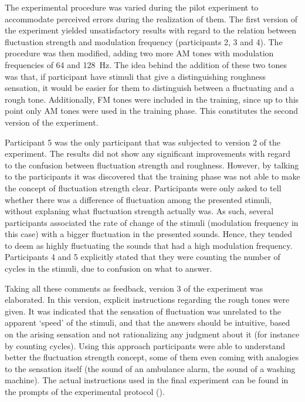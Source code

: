\documentclass[../main.tex]{subfiles}
\begin{document}
The experimental procedure was varied during the pilot experiment to accommodate
perceived errors during the realization of them. The first version of the
experiment yielded unsatisfactory results with regard to the relation between
fluctuation strength and modulation frequency (participants 2, 3 and 4). The
procedure was then modified, adding two more \gls{AM} tones with modulation
frequencies of 64 and 128~Hz. The idea behind the addition of these two tones
was that, if participant have stimuli that give a distinguishing roughness
sensation, it would be easier for them to distinguish between a fluctuating and
a rough tone. Additionally, \gls{FM} tones were included in the training, since
up to this point only \gls{AM} tones were used in the training phase. This
constitutes the second version of the experiment.

Participant 5 was the only participant that was subjected to version 2 of the
experiment. The results did not show any significant improvements with regard
to the confusion between fluctuation strength and roughness. However, by talking
to the participants it was discovered that the training phase was not able to
make the concept of fluctuation strength clear. Participants were only asked to
tell whether there was a difference of fluctuation among the presented stimuli,
without explaning what fluctuation strength actually was. As such, several
participants associated the rate of change of the stimuli (modulation frequency
in this case) with a bigger fluctuation in the presented sounds. Hence, they
tended to deem as highly fluctuating the sounds that had a high modulation
frequency. Participants 4 and 5 explicitly stated that they were counting the
number of cycles in the stimuli, due to confusion on what to answer.

Taking all these comments as feedback, version 3 of the experiment was
elaborated. In this version, explicit instructions regarding the rough tones
were given. It was indicated that the sensation of fluctuation was unrelated to
the apparent `speed' of the stimuli, and that the answers should be intuitive,
based on the arising sensation and not rationalizing any judgment about it
(for instance by counting cycles). Using this approach participants were able to
understand better the fluctuation strength concept, some of them even coming
with analogies to the sensation itself (the sound of an ambulance alarm, the
sound of a washing machine). The actual instructions used in the final
experiment can be found in the prompts of the experimental protocol
().
\end{document}
